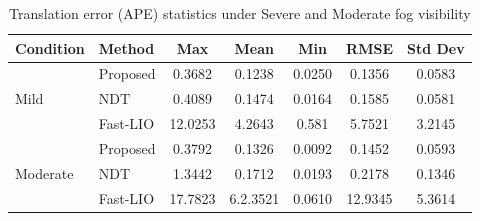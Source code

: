 \begin{table}[H]
	\centering
	\caption{Translation error (APE) statistics under Severe and Moderate  fog visibility}
	\label{tab:ape_fog_translation}
	\begin{tabular}{l l c c c c c}
		\toprule
		\textbf{Condition} & \textbf{Method} & \textbf{Max} & \textbf{Mean} & \textbf{Min} & \textbf{RMSE} & \textbf{Std Dev} \\
		\midrule
		
		\multirow{3}{*}{Mild} 
		& Proposed     & 0.3682 & 0.1238 & 0.0250 & 0.1356 & 0.0583 \\
		& NDT          & 0.4089 & 0.1474 & 0.0164 & 0.1585 & 0.0581 \\
		& Fast-LIO     & 12.0253 & 4.2643 & 0.581 & 5.7521 & 3.2145 \\
		
		\midrule
		
		\multirow{3}{*}{Moderate} 
		& Proposed     & 0.3792 & 0.1326 & 0.0092 & 0.1452 & 0.0593 \\
		& NDT          & 1.3442 & 0.1712 & 0.0193 & 0.2178 & 0.1346 \\
		& Fast-LIO     & 17.7823 & 6.2.3521 & 0.0610 & 12.9345 & 5.3614 \\
		
		\bottomrule
	\end{tabular}
\end{table}





